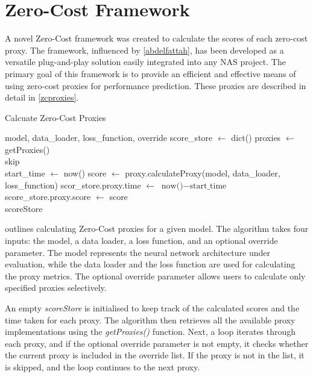 \section{Zero-Cost Framework}\label{sec:zc-framework}

A novel Zero-Cost framework was created to calculate the scores of each zero-cost proxy. The framework, influenced by \cref{abdelfattah}, has been developed as a versatile plug-and-play solution easily integrated into any \gls{NAS} project. The primary goal of this framework is to provide an efficient and effective means of using zero-cost proxies for performance prediction. These proxies are described in detail in \cref{zcproxies}.



\begin{algorithm}
    \begin{algorithmic}[1]
        \caption{Calcuate Zero-Cost Proxies}\label{alg:zc_framework}
        \Require model, data\_loader, loss\_function, override
        \State score\_store $\gets$ dict()
        \State proxies $\gets$ getProxies() 
        \\
                    \State skip
                \EndIf
            \EndIf
            \\
            \State start\_time $\gets$ now()
            \State score $\gets$ proxy.calculateProxy(model, data\_loader, loss\_function)
            \State scor\_store.proxy.time $\gets$ $\text{now()}-\text{start\_time}$
            \State score\_store.proxy.score $\gets$ score
        \EndFor
        \\
        \State \Return scoreStore
        
    \end{algorithmic}
\end{algorithm}

 outlines calculating Zero-Cost proxies for a given model. The algorithm takes four inputs: the model, a data loader, a loss function, and an optional override parameter. The model represents the neural network architecture under evaluation, while the data loader and the loss function are used for calculating the proxy metrics. The optional override parameter allows users to calculate only specified proxies selectively.

An empty \textit{scoreStore} is initialised to keep track of the calculated scores and the time taken for each proxy. The algorithm then retrieves all the available proxy implementations using the \textit{getProxies()} function. Next, a loop iterates through each proxy, and if the optional override parameter is not empty, it checks whether the current proxy is included in the override list. If the proxy is not in the list, it is skipped, and the loop continues to the next proxy.

